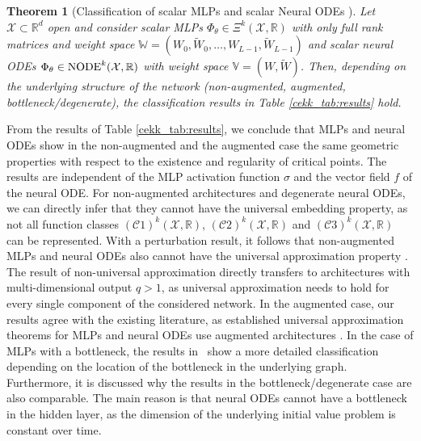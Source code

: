 \documentclass[10pt]{article}
\newcommand{\R}{{\mathbb R}}
\def\R{\mathbb{R}}
\newtheorem{theorem}{Theorem}[section]
\begin{document}
\begin{theorem}[Classification of scalar MLPs and scalar Neural ODEs \cite{KuehnKuntz2024}] \label{cekk_th:classification}
	Let $\mathcal{X}\subset \R^d$ open and consider scalar MLPs $\Phi_\theta \in \Xi^k(\mathcal{X},\R)$ with only full rank matrices and weight space $\mathbb{W} = (W_0,\widetilde{W}_0,\ldots,  W_{L-1}, \widetilde W_{L-1})$ and scalar neural ODEs $\Phi_\theta \in \textup{NODE}^k(\mathcal{X},\R)$ with weight space $\mathbb{V} = (W,\widetilde W)$. Then, depending on the underlying structure of the network (non-augmented, augmented, bottleneck/degenerate), the classification results in Table \ref{cekk_tab:results} hold.
\end{theorem}



From the results of Table \ref{cekk_tab:results}, we conclude that MLPs and neural ODEs show in the non-augmented and the augmented case the same geometric properties with respect to the existence and regularity of critical points. The results are independent of the MLP activation function $\sigma$ and the vector field $f$ of the neural ODE. For non-augmented architectures and degenerate neural ODEs, we can directly infer that they cannot have the universal embedding property, as not all function classes $(\mathcal{C}1)^k(\mathcal{X},\mathbb{R})$, $(\mathcal{C}2)^k(\mathcal{X},\mathbb{R})$ and $(\mathcal{C}3)^k(\mathcal{X},\mathbb{R})$ can be represented. With a perturbation result, it follows that non-augmented MLPs and neural ODEs also cannot have the universal approximation property \cite{KuehnKuntz2024}. The result of non-universal approximation directly transfers to architectures with multi-dimensional output $q>1$, as universal approximation needs to hold for every single component of the considered network. In the augmented case, our results agree with the existing literature, as established universal approximation theorems for MLPs and neural ODEs use augmented architectures \cite{Hornik1989,  Kidger2022, KuehnKuntz2023, Pinkus1999}. In the case of MLPs with a bottleneck, the results in~\cite{KuehnKuntz2024} show a more detailed classification depending on the location of the bottleneck in the underlying graph. Furthermore, it is discussed why the results in the bottleneck/degenerate case are also comparable. The main reason is that neural ODEs cannot have a bottleneck in the hidden layer, as the dimension of the underlying initial value problem is constant over time. 
\end{document}
